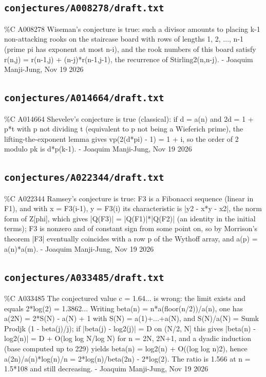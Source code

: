 \subsection*{\texttt{conjectures/A008278/draft.txt}}
{\small\raggedright\ttfamily
\%C A008278 Wiseman's conjecture is true: such a divisor amounts to placing k-1 non-attacking rooks on the staircase board with rows of lengths 1, 2, ..., n-1 (prime pi has exponent at most n-i), and the rook numbers of this board satisfy r(n,j) = r(n-1,j) + (n-j)*r(n-1,j-1), the recurrence of Stirling2(n,n-j). - Joaquim Manji-Jung, Nov 19 2026\par
}
\subsection*{\texttt{conjectures/A014664/draft.txt}}
{\small\raggedright\ttfamily
\%C A014664 Shevelev's conjecture is true (classical): if d = a(n) and 2d = 1 + p*t with p not dividing t (equivalent to p not being a Wieferich prime), the lifting-the-exponent lemma gives vp(2(d*pi) - 1) = 1 + i, so the order of 2 modulo pk is d*p(k-1). - Joaquim Manji-Jung, Nov 19 2026\par
}
\subsection*{\texttt{conjectures/A022344/draft.txt}}
{\small\raggedright\ttfamily
\%C A022344 Ramsey's conjecture is true: F3 is a Fibonacci sequence (linear in F1), and with x = F3(i-1), y = F3(i) its characteristic is |y2 - x*y - x2|, the norm form of Z[phi], which gives |Q(F3)| = |Q(F1)|*|Q(F2)| (an identity in the initial terms); F3 is nonzero and of constant sign from some point on, so by Morrison's theorem |F3| eventually coincides with a row p of the Wythoff array, and a(p) = a(n)*a(m). - Joaquim Manji-Jung, Nov 19 2026\par
}
\subsection*{\texttt{conjectures/A033485/draft.txt}}
{\small\raggedright\ttfamily
\%C A033485 The conjectured value c = 1.64... is wrong: the limit exists and equals 2*log(2) = 1.3862... Writing beta(n) = n*a(floor(n/2))/a(n), one has a(2N) = 2*S(N) - a(N) + 1 with S(N) = a(1)+...+a(N), and S(N)/a(N) = Sumk Prodjk (1 - beta(j)/j); if |beta(j) - log2(j)| = D on (N/2, N] this gives |beta(n) - log2(n)| = D + O(log log N/log N) for n = 2N, 2N+1, and a dyadic induction (base computed up to 229) yields beta(n) = log2(n) + O((log log n)2), hence a(2n)/a(n)*log(n)/n = 2*log(n)/beta(2n) - 2*log(2). The ratio is 1.566 at n = 1.5*108 and still decreasing. - Joaquim Manji-Jung, Nov 19 2026\par
}

